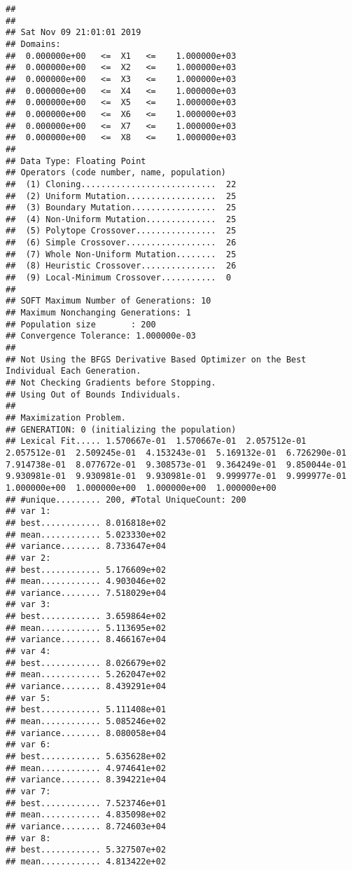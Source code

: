 \documentclass[]{article}
\begin{document}
\begin{verbatim}
## 
## 
## Sat Nov 09 21:01:01 2019
## Domains:
##  0.000000e+00   <=  X1   <=    1.000000e+03 
##  0.000000e+00   <=  X2   <=    1.000000e+03 
##  0.000000e+00   <=  X3   <=    1.000000e+03 
##  0.000000e+00   <=  X4   <=    1.000000e+03 
##  0.000000e+00   <=  X5   <=    1.000000e+03 
##  0.000000e+00   <=  X6   <=    1.000000e+03 
##  0.000000e+00   <=  X7   <=    1.000000e+03 
##  0.000000e+00   <=  X8   <=    1.000000e+03 
## 
## Data Type: Floating Point
## Operators (code number, name, population) 
##  (1) Cloning...........................  22
##  (2) Uniform Mutation..................  25
##  (3) Boundary Mutation.................  25
##  (4) Non-Uniform Mutation..............  25
##  (5) Polytope Crossover................  25
##  (6) Simple Crossover..................  26
##  (7) Whole Non-Uniform Mutation........  25
##  (8) Heuristic Crossover...............  26
##  (9) Local-Minimum Crossover...........  0
## 
## SOFT Maximum Number of Generations: 10
## Maximum Nonchanging Generations: 1
## Population size       : 200
## Convergence Tolerance: 1.000000e-03
## 
## Not Using the BFGS Derivative Based Optimizer on the Best Individual Each Generation.
## Not Checking Gradients before Stopping.
## Using Out of Bounds Individuals.
## 
## Maximization Problem.
## GENERATION: 0 (initializing the population)
## Lexical Fit..... 1.570667e-01  1.570667e-01  2.057512e-01  2.057512e-01  2.509245e-01  4.153243e-01  5.169132e-01  6.726290e-01  7.914738e-01  8.077672e-01  9.308573e-01  9.364249e-01  9.850044e-01  9.930981e-01  9.930981e-01  9.930981e-01  9.999977e-01  9.999977e-01  1.000000e+00  1.000000e+00  1.000000e+00  1.000000e+00  
## #unique......... 200, #Total UniqueCount: 200
## var 1:
## best............ 8.016818e+02
## mean............ 5.023330e+02
## variance........ 8.733647e+04
## var 2:
## best............ 5.176609e+02
## mean............ 4.903046e+02
## variance........ 7.518029e+04
## var 3:
## best............ 3.659864e+02
## mean............ 5.113695e+02
## variance........ 8.466167e+04
## var 4:
## best............ 8.026679e+02
## mean............ 5.262047e+02
## variance........ 8.439291e+04
## var 5:
## best............ 5.111408e+01
## mean............ 5.085246e+02
## variance........ 8.080058e+04
## var 6:
## best............ 5.635628e+02
## mean............ 4.974641e+02
## variance........ 8.394221e+04
## var 7:
## best............ 7.523746e+01
## mean............ 4.835098e+02
## variance........ 8.724603e+04
## var 8:
## best............ 5.327507e+02
## mean............ 4.813422e+02

\end{verbatim}
\end{document}
